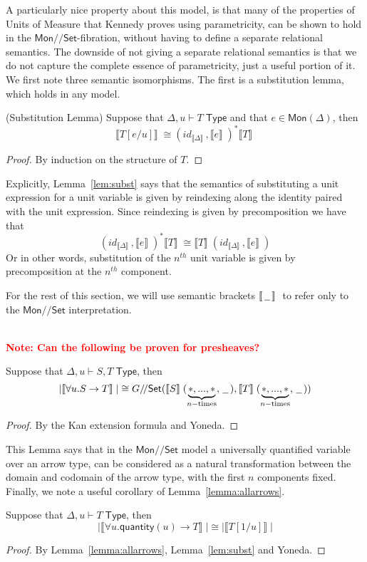 \documentclass[a4paper,UKenglish]{lipics}
\newcommand\note[1]{{ \bf \textcolor{red} {\vspace{2mm}\; \\ Note: #1\\}}}
\newcommand{\UoM}{Units of Measure\xspace}
\newcommand{\msf}[1]{\mathsf{#1}} %
\newcommand{\Mon}{\msf{Mon}}
\newcommand{\Set}{\msf{Set}}
\newcommand{\blank}{\, \underline{\hspace{2mm}} \,}
\newcommand{\GroupSet}[1]{#1/\!/\Set}
\newcommand{\MonSet}{\GroupSet{\Mon}}
\newcommand{\GSet}{\GroupSet{G}}
\newcommand{\sem}[1]{\ensuremath{\llbracket #1 \rrbracket} \;}
\newcommand{\qnt}{\msf{quantity}}
\begin{document}
A particularly nice property about this model, is that many of the properties of \UoM that Kennedy proves using parametricity, can be shown to hold in the $\MonSet$-fibration, without having to define a separate relational semantics. The downside of not giving a separate relational semantics is that we do not capture the complete essence of parametricity, just a useful portion of it. We first note three semantic isomorphisms. The first is a substitution lemma, which holds in any model.

\begin{lemma}(Substitution Lemma)
\label{lem:subst}
Suppose that $\Delta, u \vdash T \; \msf{ Type}$ and that $e \in \Mon(\Delta)$, then
\[
 \sem{T[e/u]} \cong (id_{\sem{\Delta}} , \sem{e})^\ast \sem{T}
\]
\end{lemma}
\begin{proof}
 By induction on the structure of $T$.
\end{proof}


Explicitly, Lemma~\ref{lem:subst} says that the semantics of substituting a unit expression for a unit variable is given by reindexing along the identity paired with the unit expression. Since reindexing is given by precomposition we have that
\[
 (id_{\sem{\Delta}} , \sem{e})^\ast \sem{T} \cong \sem{T}(id_{\sem{\Delta}}, \sem{e})
\]
Or in other words, substitution of the $n^{th}$ unit variable is given by precomposition at the $n^{th}$ component.

For the rest of this section, we will use semantic brackets $\sem{\, \underline{\hspace{2mm}}\, }$ to refer only to the $\MonSet$ interpretation.

\note{Can the following be proven for presheaves?}
\begin{lemma}
\label{lemma:allarrows}
 Suppose that $\Delta, u \vdash S,T \; \msf{ Type}$, then
\[
|\sem{\forall u. S \rightarrow T}| \cong \GSet (\sem{S}(\underbrace{\ast,...,\ast}_{n-\text{times}}, \blank),\sem{T}(\underbrace{\ast,...,\ast}_{n-\text{times}}, \blank))
\]
\end{lemma}
\begin{proof}
By the Kan extension formula and Yoneda.
\end{proof}

This Lemma says that in the $\MonSet$ model a universally quantified variable over an arrow type, can be considered as a natural transformation between the domain and codomain of the arrow type, with the first $n$ components fixed. Finally, we note a useful corollary of Lemma~\ref{lemma:allarrows}.
\begin{corollary}
\label{cor:subs}
Suppose that $\Delta, u \vdash T \; \msf{ Type}$, then
 \[
  |\sem{\forall u . \qnt(u) \rightarrow T}| \cong |\sem{T[1/u]}|
\]
\end{corollary}
\begin{proof}
 By Lemma~\ref{lemma:allarrows}, Lemma~\ref{lem:subst} and Yoneda.
\end{proof}
\end{document}
